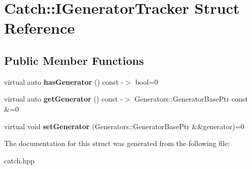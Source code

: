 \hypertarget{structCatch_1_1IGeneratorTracker}{}\section{Catch\+::I\+Generator\+Tracker Struct Reference}
\label{structCatch_1_1IGeneratorTracker}
\subsection*{Public Member Functions}
\begin{DoxyCompactItemize}
\item 
\mbox{\label{structCatch_1_1IGeneratorTracker_ae88084f9af27c8b9a5d5775b9c148498}} 
virtual auto {\bfseries has\+Generator} () const -\/$>$ bool=0
\item 
\mbox{\label{structCatch_1_1IGeneratorTracker_a23be942fc51672598bfa02c678c3078a}} 
virtual auto {\bfseries get\+Generator} () const -\/$>$ Generators\+::\+Generator\+Base\+Ptr const \&=0
\item 
\mbox{\label{structCatch_1_1IGeneratorTracker_a9945eff42219edc5a7071eebd8b0419e}} 
virtual void {\bfseries set\+Generator} (Generators\+::\+Generator\+Base\+Ptr \&\&generator)=0
\end{DoxyCompactItemize}


The documentation for this struct was generated from the following file\+:\begin{DoxyCompactItemize}
\item 
catch.\+hpp\end{DoxyCompactItemize}
